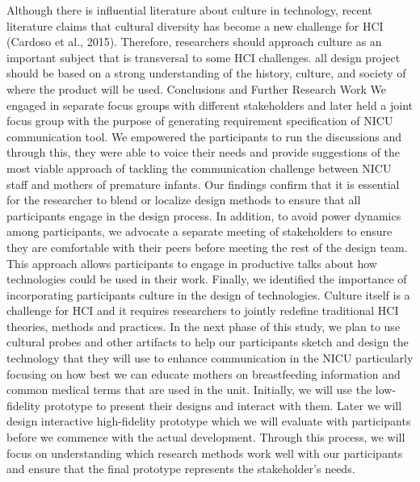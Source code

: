 Although there is influential literature about culture in technology, recent literature claims that cultural diversity has become a new challenge for HCI (Cardoso et al., 2015). Therefore, researchers should approach culture as an important subject that is transversal to some HCI challenges. all design project should be based on a strong understanding of the history, culture, and society of where the product will be used.
﻿Conclusions and Further Research Work
We engaged in separate focus groups with different stakeholders and later held a joint focus group with the purpose of generating requirement specification of NICU communication tool. We empowered the participants to run the discussions and through this, they were able to voice their needs and provide suggestions of the most viable approach of tackling the communication challenge between NICU staff and mothers of premature infants. Our findings confirm that it is essential for the researcher to blend or localize design methods to ensure that all participants engage in the design process. In addition, to avoid power dynamics among participants, we advocate a separate meeting of stakeholders to ensure they are comfortable with their peers before meeting the rest of the design team. This approach allows participants to engage in productive talks about how technologies could be used in their work. Finally, we identified the importance of incorporating participants culture in the design of technologies. Culture itself is a challenge for HCI and it requires researchers to jointly redefine traditional HCI theories, methods and practices.
In the next phase of this study, we plan to use cultural probes and other artifacts to help our participants sketch and design the technology that they will use to enhance communication in the NICU particularly focusing on how best we can educate mothers on breastfeeding information and common medical terms that are used in the unit. Initially, we will use the low-fidelity prototype to present their designs and interact with them. Later we will design interactive high-fidelity prototype which we will evaluate with participants before we commence with the actual development. Through this process, we will focus on understanding which research methods work well with our participants and ensure that the final prototype represents the stakeholder's needs.
